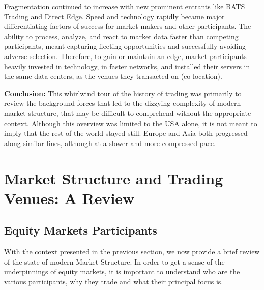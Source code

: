 Fragmentation continued to increase with new prominent entrants like BATS Trading and Direct Edge.  Speed and technology rapidly became major differentiating factors of success for market makers and other participants. The ability to process, analyze, and react to market data faster than competing participants, meant capturing fleeting opportunities and successfully avoiding adverse selection. Therefore, to gain or maintain an edge, market participants heavily invested in technology, in faster networks, and installed their servers in the same data centers, as the venues they transacted on (co-location). \twomedskip


\noindent\textbf{Conclusion:} This whirlwind tour of the history of trading was primarily to review the background forces that led to the dizzying complexity of modern market structure, that may be difficult to comprehend without the appropriate context. Although this overview was limited to the USA alone, it is not meant to imply that the rest of the world stayed still. Europe and Asia both progressed along similar lines, although at a slower and more compressed pace.



\section{Market Structure and Trading Venues: A Review}

\subsection{Equity Markets Participants} 

With the context presented in the previous section, we now provide a brief review of the state of modern Market Structure. In order to get a sense of the underpinnings of equity markets, it is important to understand who are the various participants, why they trade and what their principal focus is. \twomedskip


